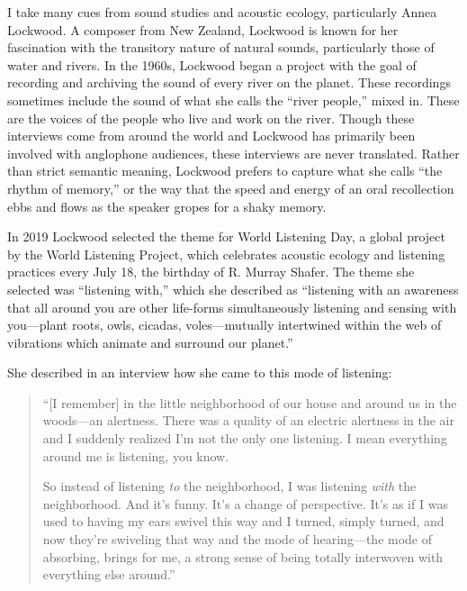\documentclass[12pt,letterpaper]{article}
\begin{document}
	I take many cues from sound studies and acoustic ecology, particularly 
	Annea Lockwood. A composer from New Zealand, Lockwood is known for her 
	fascination with the transitory nature of natural sounds, particularly 
	those of water and rivers. In the 1960s, Lockwood began a project with
	the goal of recording and archiving the sound of every river on the 
	planet.\autocite[117]{Rodgers} These recordings sometimes include the 
	sound of what she calls the ``river people,'' mixed in. These are the 	
	voices of the people who live and work on the 
	river.\autocite[121]{Rodgers} Though these interviews come from around 	
	the world and Lockwood has primarily been involved with anglophone 
	audiences, these interviews are never translated. Rather than strict 
	semantic meaning, Lockwood prefers to capture what she calls ``the 
	rhythm of memory,'' or the way that the speed and energy of an oral 
	recollection ebbs and flows as the speaker gropes for a shaky 
	memory.\autocite[122]{Rodgers}  

	In 2019 Lockwood selected the theme for World Listening Day, a global
	project by the World Listening Project, which celebrates acoustic 
	ecology and listening practices every July 18, the birthday of R. 
	Murray Shafer. The theme she selected was ``listening with,'' which she
	described as ``listening with an awareness that all around you are other
	life-forms simultaneously listening and sensing with you---plant roots,
	owls, cicadas, voles---mutually intertwined within the web of vibrations
	which animate and surround our planet.''\autocite{WLP}  

	She described in an interview how she came to this mode of listening:
	
	\begin{quote}
	\singlespacing

	``[I remember] in the little neighborhood of our house and around us 
	in the 
	woods---an alertness. There was a quality of an electric alertness in 
	the air and I suddenly realized I'm not the only one listening. I mean 
	everything around me is listening, you know.
	
	So instead of listening \textit{to} the neighborhood, I was listening 
	\textit{with} the neighborhood. And it's funny. It's a change of 
	perspective. It's as if I was used to having my ears swivel this way and
	I turned, simply turned, and now they're swiveling that way and the mode
	of hearing---the mode of absorbing, brings for me, a strong sense of 
	being totally interwoven with everything else 
	around.''\autocite{WLPVimeo} 
	
	\end{quote}
	\doublespacing
\end{document}
